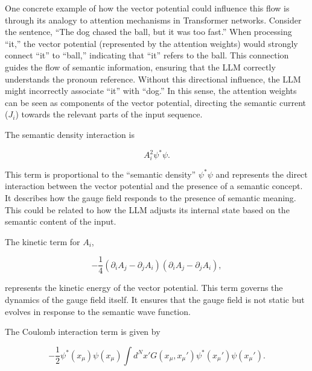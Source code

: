 \documentclass[prd,amsmath,amssymb,12pt]{revtex4}
\begin{document}
One concrete example of how the vector potential could influence this flow is through its analogy
to attention mechanisms in Transformer networks. Consider the sentence, ``The dog chased the ball,
but it was too fast.'' When processing ``it,'' the vector potential (represented by the
attention weights) would strongly connect ``it'' to ``ball,'' indicating that ``it'' refers to the ball.
This connection guides the flow of semantic information, ensuring that the LLM correctly understands
the pronoun reference. Without this directional influence, the LLM might incorrectly
associate ``it'' with ``dog.'' In this sense, the attention
weights can be seen as components of the vector potential, directing the semantic current ($J_i$) towards
the relevant parts of the input sequence.

The semantic density interaction is

\begin{equation}
    A_i^2 \psi^* \psi.
\end{equation}

\noindent
This term is proportional to the ``semantic density'' $\psi^* \psi$ and represents the direct interaction between
the vector potential and the presence of a semantic concept. It describes how the gauge field responds to the
presence of semantic meaning. This could be related to how the LLM adjusts its internal state based on the
semantic content of the input.

The kinetic term for $A_i$,

\begin{equation}
    -\frac{1}{4}  (\partial_i A_j - \partial_j A_i)(\partial_i A_j - \partial_j A_i),
\end{equation}

\noindent
represents the kinetic energy of the vector potential. This term governs the dynamics of the gauge field itself.
It ensures that the gauge field is not static but evolves in response to the semantic wave function.

The Coulomb interaction term is given by

\begin{equation}
    -\frac{1}{2} \psi^*(x_{\mu}) \psi(x_{\mu}) \int d^{N}x' G(x_{\mu}, x_{\mu}') \psi^*(x_{\mu}') \psi(x_{\mu}').
\end{equation}
\end{document}
